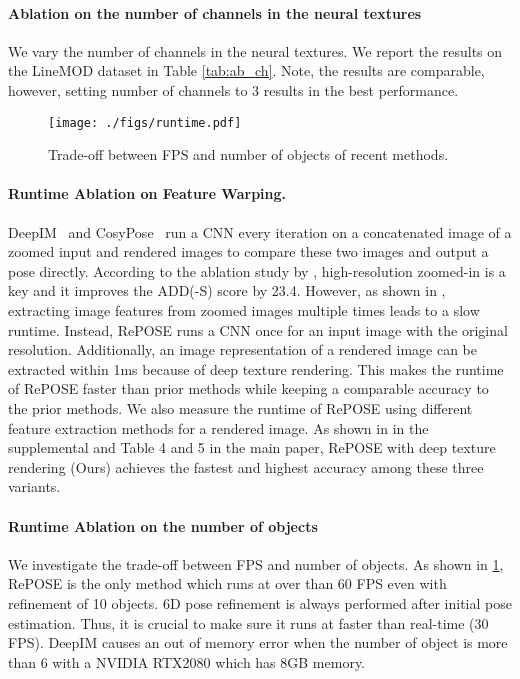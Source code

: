 \documentclass[10pt,twocolumn,letterpaper]{article}
\begin{document}
\paragraph{Ablation on the number of channels in the neural textures}
We vary the number of channels in the neural textures. We report the results on the LineMOD dataset in Table \ref{tab:ab_ch}. Note, the results are comparable, however, setting number of channels to $3$ results in the best performance.

\begin{figure}[t]
  \centering
  \hspace*{-0.4cm}
  \texttt{[image: ./figs/runtime.pdf]}
  \caption{Trade-off between FPS and number of objects of recent methods.}
  \label{fig:runtime}
\end{figure}

\paragraph{Runtime Ablation on Feature Warping.}
DeepIM~\cite{li2018deepim} and CosyPose~\cite{labbe2020} run a CNN every iteration on a concatenated image of a zoomed input and rendered images to compare these two images and output a pose directly.
According to the ablation study by \cite{li2018deepim}, high-resolution zoomed-in is a key and it improves the ADD(-S) score by 23.4. 
However, as shown in , extracting image features from zoomed images multiple times leads to a slow runtime.
Instead, RePOSE runs a CNN once for an input image with the original resolution. Additionally, an image representation of a rendered image can be extracted within 1ms because of deep texture rendering. This makes the runtime of RePOSE faster than prior methods while keeping a comparable accuracy to the prior methods.
We also measure the runtime of RePOSE using different feature extraction methods for a rendered image.
As shown in  in the supplemental and Table 4 and 5 in the main paper, RePOSE with deep texture rendering (Ours) achieves the fastest and highest accuracy among these three variants.


\paragraph{Runtime Ablation on the number of objects}
We investigate the trade-off between FPS and number of objects.
As shown in \ref{fig:runtime}, RePOSE is the only method which runs at over than 60 FPS even with refinement of 10 objects. 6D pose refinement is always performed after initial pose estimation. Thus, it is crucial to make sure it runs at faster than real-time (30 FPS). DeepIM causes an out of memory error when the number of object is more than 6 with a NVIDIA RTX2080 which has 8GB memory.
\end{document}

